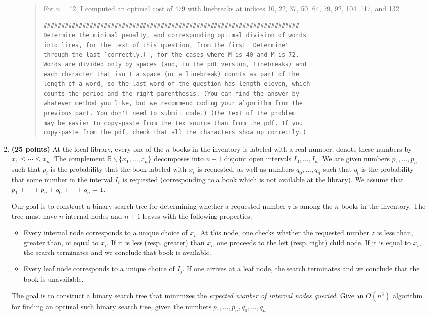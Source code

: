 \documentclass[11pt]{article}
\begin{document}
\begin{enumerate}
\begin{enumerate}
\begin{quote}
  \medskip
For $n = 72$, I computed an optimal cost of $479$ with linebreaks at indices 10, 22, 37, 50, 64, 79, 92, 104, 117, and 132.
\begin{verbatim}
########################################################################
Determine the minimal penalty, and corresponding optimal division of words
into lines, for the text of this question, from the first `Determine'
through the last `correctly.)', for the cases where M is 40 and M is 72.
Words are divided only by spaces (and, in the pdf version, linebreaks) and
each character that isn't a space (or a linebreak) counts as part of the
length of a word, so the last word of the question has length eleven, which
counts the period and the right parenthesis. (You can find the answer by
whatever method you like, but we recommend coding your algorithm from the
previous part. You don't need to submit code.) (The text of the problem
may be easier to copy-paste from the tex source than from the pdf. If you
copy-paste from the pdf, check that all the characters show up correctly.)
\end{verbatim}
\end{quote}
\end{enumerate}

\item \textbf{(25 points)} At the local library, every one of the $n$ books in the inventory is labeled with a real number; denote these numbers by $x_1 \le \cdots \le x_n$. The complement $\mathbb{R}\backslash \{x_1,\ldots,x_n\}$ decomposes into $n+1$ disjoint open intervals $I_0,\ldots, I_n$. We are given numbers $p_1,\ldots,p_n$ such that $p_i$ is the probability that the book labeled with $x_i$ is requested, as well as numbers $q_0,\ldots,q_n$ such that $q_i$ is the probability that some number in the interval $I_i$ is requested (corresponding to a book which is not available at the library). We assume that $p_1 + \cdots + p_n + q_0 + \cdots + q_n = 1$.

Our goal is to construct a binary search tree for determining whether a requested number $z$ is among the $n$ books in the inventory. The tree must have $n$ internal nodes and $n + 1$ leaves with the following properties:
\begin{itemize}
    \item Every internal node corresponds to a unique choice of $x_i$. At this node, one checks whether the requested number $z$ is less than, greater than, or equal to $x_i$. If it is less (resp. greater) than $x_i$, one proceeds to the left (resp. right) child node. If it is equal to $x_i$, the search terminates and we conclude that book is available.
    \item Every leaf node corresponds to a unique choice of $I_j$. If one arrives at a leaf node, the search terminates and we conclude that the book is unavailable.
\end{itemize}
The goal is to construct a binary search tree that minimizes the \emph{expected number of internal nodes queried}. Give an $O(n^3)$ algorithm for finding an optimal such binary search tree, given the numbers $p_1,\ldots,p_n,q_0,\ldots,q_n$.


\end{enumerate}
\end{document}
